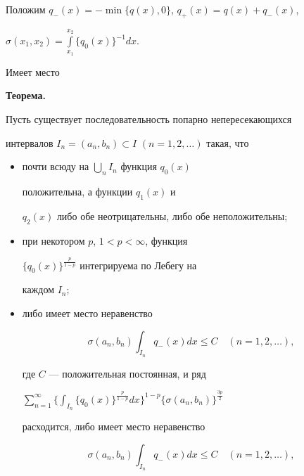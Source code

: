 \medskip 


 


Положим $q_-(x)=-\min\{q(x),0\}$, $q_+(x)=q(x)+q_-(x)$, 


$\sigma(x_1,x_2)=\int\limits^{x_2}_{x_1}\{q_0(x)\}^{-1}d x$. 


Имеет место 


\medskip 


 


{\bf Теорема.} {\it 


Пусть существует последовательность попарно непересекающихся 


интервалов $I_n=(a_n,b_n)\subset I$ $(n=1,2,\dotsc)$ такая, что 


\begin{itemize} 


\item[1)] почти всюду на $\bigcup\limits_n I_n$ функция $q_0(x)$ 


положительна, а функции $q_1(x)$ и 


$q_2(x)$ либо обе неотрицательны, либо обе неположительны$;$ 


\item[2)] при некотором $p$, $1<p<\infty$, функция 


$\{q_0(x)\}^{\frac{p}{1-p}}$ интегрируема по Лебегу на 


каждом $I_n;$ 


\item[3)] либо имеет место неравенство 


\begin{equation} 


\sigma(a_n,b_n)\int_{I_n}q_-(x)d x\le C\quad (n=1,2,\dotsc), 


\end{equation} 


где $C$ --- положительная постоянная, и ряд 


$\displaystyle\sum^\infty_{n=1}\bigg\{\int_{I_n}\{q_0(x) 


\}^{\frac{p}{1-p}}d x\bigg\}^{1-p}\{\sigma(a_n,b_n)\}^{\frac{3p}{2}} 


$ 


расходится, либо имеет место неравенство 


\begin{equation} 


\sigma(a_n,b_n)\int_{I_n}q_-(x)d x\le C\quad (n=1,2,\dotsc), 


\end{equation} 



\end{itemize}}
